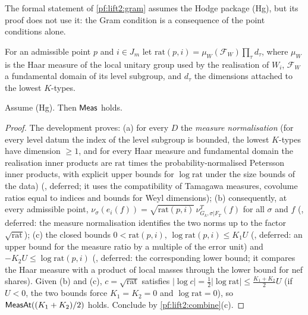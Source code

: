 \begin{remark}\label{pf:lift2:gramrem}
The formal statement of \cref{pf:lift2:gram} assumes the Hodge package \textup{(Hg)}, but its proof does not use it: the
Gram condition is a consequence of the point conditions alone.
\end{remark}

\begin{definition}\label{pf:lift2:def:rat}
For an admissible point $p$ and $i\in J_m$ let $\mathrm{rat}(p,i)=\mu_W(\mathcal F_W)\prod_\tau d_\tau$, where $\mu_W$ is
the Haar measure of the local unitary group used by the realisation of $W_i$, $\mathcal F_W$ a fundamental domain of
its level subgroup, and $d_\tau$ the dimensions attached to the lowest $K$-types.
\end{definition}

\begin{proposition}\label{pf:lift2:meas}
Assume \textup{(Hg)}. Then $\mathsf{Meas}$ holds.
\end{proposition}

\begin{proof}
The development proves: (a) for every $D$ the \emph{measure normalisation} (for every level datum the index of the
level subgroup is bounded, the lowest $K$-types have dimension $\ge1$, and for every Haar measure and fundamental
domain the realisation inner products are $\mathrm{rat}$ times the probability-normalised Petersson inner products,
with explicit upper bounds for $\log\mathrm{rat}$ under the size bounds of the data)
(, deferred; it uses the compatibility of Tamagawa measures,
covolume ratios equal to indices and bounds for Weyl dimensions); (b) consequently, at every admissible point,
$\nu_\sigma(e_i(f))=\sqrt{\mathrm{rat}(p,i)}\,\nu^T_{G_k,\sigma|F_T}(f)$ for all $\sigma$ and $f$
(, deferred: the measure normalisation identifies the two norms up to
the factor $\sqrt{\mathrm{rat}}$); (c) the closed bounds $0<\mathrm{rat}(p,i)$, $\log\mathrm{rat}(p,i)\le K_1U$
(, deferred: an upper bound for the measure ratio by a
multiple of the error unit) and $-K_2U\le\log\mathrm{rat}(p,i)$
(, deferred: the corresponding lower bound; it compares the
Haar measure with a product of local masses through the lower bound for nef shares). Given (b) and (c),
$c=\sqrt{\mathrm{rat}}$ satisfies $|\log c|=\frac12|\log\mathrm{rat}|\le\frac{K_1+K_2}2U$ (if $U<0$, the two bounds
force $K_1=K_2=0$ and $\log\mathrm{rat}=0$), so $\mathsf{MeasAt}((K_1+K_2)/2)$ holds. Conclude by
\cref{pf:lift2:combine}(c).
\end{proof}

